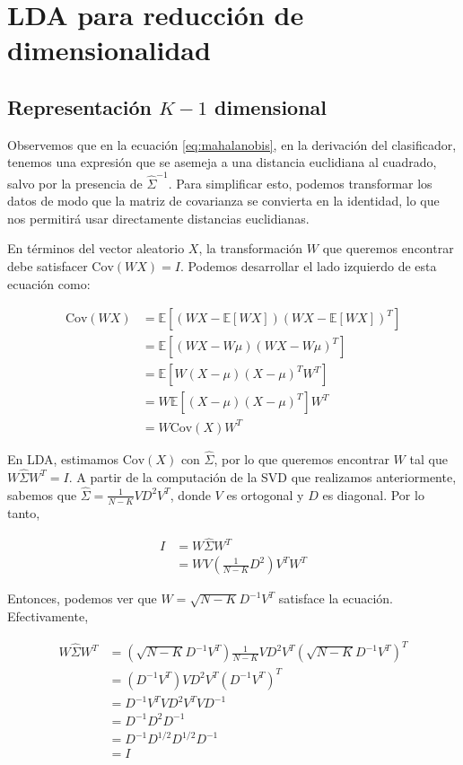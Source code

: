 \section{LDA para reducción de dimensionalidad}

\subsection{Representación $K-1$ dimensional}

Observemos que en la ecuación \ref{eq:mahalanobis}, en la derivación del clasificador, tenemos una expresión que se asemeja a una distancia euclidiana al cuadrado, salvo por la presencia de $\hat{\Sigma}^{-1}$. Para simplificar esto, podemos transformar los datos de modo que la matriz de covarianza se convierta en la identidad, lo que nos permitirá usar directamente distancias euclidianas.

En términos del vector aleatorio $X$, la transformación $W$ que queremos encontrar debe satisfacer $\text{Cov}(WX) = I$. Podemos desarrollar el lado izquierdo de esta ecuación como:

\begin{align}
\text{Cov}(WX) &= \mathbb{E}\left[ (WX - \mathbb{E}[WX])(WX - \mathbb{E}[WX])^T \right] \nonumber \\
&= \mathbb{E}\left[ (WX - W\mu)(WX - W\mu)^T \right] \nonumber \\
&= \mathbb{E}\left[ W(X - \mu)(X - \mu)^T W^T \right] \nonumber \\
&= W \mathbb{E}\left[ (X - \mu)(X - \mu)^T \right] W^T \nonumber \\
&= W \text{Cov}(X) W^T \label{eq:covariance-transformation}
\end{align}

En LDA, estimamos $\text{Cov}(X)$ con $\hat{\Sigma}$, por lo que queremos encontrar $W$ tal que $W \hat{\Sigma} W^T = I$. A partir de la computación de la SVD que realizamos anteriormente, sabemos que $\hat{\Sigma} = \frac{1}{N-K}VD^2V^T$, donde $V$ es ortogonal y $D$ es diagonal. Por lo tanto,

\begin{align*}
I & = W \hat{\Sigma} W^T \\
& = W V \left(\frac{1}{N-K}D^2\right) V^T W^T
\end{align*}

Entonces, podemos ver que $W = \sqrt{N-K}D^{-1}V^T$ satisface la ecuación. Efectivamente,

\begin{align*}
W \hat{\Sigma} W^T &= (\sqrt{N-K}D^{-1}V^T) \frac{1}{N-K}VD^2V^T (\sqrt{N-K}D^{-1}V^T)^T \\
&= (D^{-1}V^T) VD^2V^T (D^{-1}V^T)^T \\
&= D^{-1}V^T V D^2 V^T V D^{-1} \\
&= D^{-1}D^2 D^{-1} \\
&= D^{-1}D^{1/2} D^{1/2} D^{-1} \\
& = I
\end{align*}

